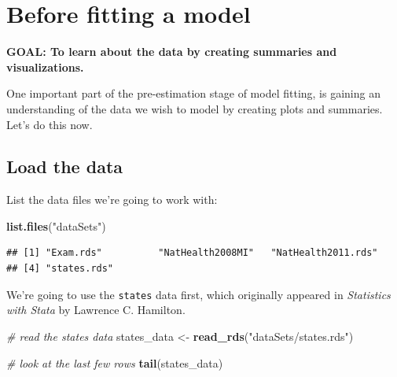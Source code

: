 \documentclass[
]{book}
\newenvironment{Shaded}{\begin{snugshade}}{\end{snugshade}}
\newcommand{\CommentTok}[1]{\textcolor[rgb]{0.56,0.35,0.01}{\textit{#1}}}
\newcommand{\KeywordTok}[1]{\textcolor[rgb]{0.13,0.29,0.53}{\textbf{#1}}}
\newcommand{\NormalTok}[1]{#1}
\newcommand{\StringTok}[1]{\textcolor[rgb]{0.31,0.60,0.02}{#1}}
\begin{document}
\hypertarget{before-fitting-a-model}{%
\section{Before fitting a model}\label{before-fitting-a-model}}

\begin{alert}

\textbf{GOAL: To learn about the data by creating summaries and visualizations.}

\end{alert}

One important part of the pre-estimation stage of model fitting, is gaining an understanding of the data we wish to model by creating plots and summaries. Let's do this now.

\hypertarget{load-the-data}{%
\subsection{Load the data}\label{load-the-data}}

List the data files we're going to work with:

\begin{Shaded}
\begin{Highlighting}[]
\KeywordTok{list.files}\NormalTok{(}\StringTok{"dataSets"}\NormalTok{)}
\end{Highlighting}
\end{Shaded}

\begin{verbatim}
## [1] "Exam.rds"          "NatHealth2008MI"   "NatHealth2011.rds"
## [4] "states.rds"
\end{verbatim}

We're going to use the \texttt{states} data first, which originally appeared in \emph{Statistics with Stata} by Lawrence C. Hamilton.

\begin{Shaded}
\begin{Highlighting}[]
  \CommentTok{\# read the states data}
\NormalTok{  states\_data \textless{}{-}}\StringTok{ }\KeywordTok{read\_rds}\NormalTok{(}\StringTok{"dataSets/states.rds"}\NormalTok{)}

  \CommentTok{\# look at the last few rows}
  \KeywordTok{tail}\NormalTok{(states\_data)}
\end{Highlighting}
\end{Shaded}
\end{document}
